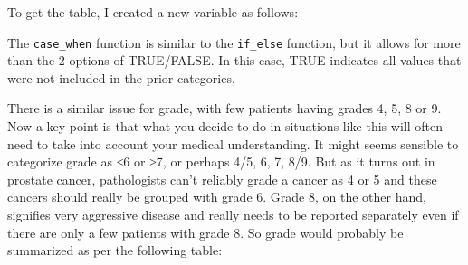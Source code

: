 \documentclass[]{book}
\newenvironment{Shaded}{\begin{snugshade}}{\end{snugshade}}
\newcommand{\DataTypeTok}[1]{\textcolor[rgb]{0.13,0.29,0.53}{#1}}
\newcommand{\KeywordTok}[1]{\textcolor[rgb]{0.13,0.29,0.53}{\textbf{#1}}}
\newcommand{\NormalTok}[1]{#1}
\newcommand{\OperatorTok}[1]{\textcolor[rgb]{0.81,0.36,0.00}{\textbf{#1}}}
\newcommand{\OtherTok}[1]{\textcolor[rgb]{0.56,0.35,0.01}{#1}}
\newcommand{\StringTok}[1]{\textcolor[rgb]{0.31,0.60,0.02}{#1}}
\begin{document}
To get the table, I created a new variable as follows:

\begin{Shaded}
\end{Shaded}

The \texttt{case\_when} function is similar to the \texttt{if\_else}
function, but it allows for more than the 2 options of TRUE/FALSE. In
this case, TRUE indicates all values that were not included in the prior
categories.

There is a similar issue for grade, with few patients having grades 4,
5, 8 or 9. Now a key point is that what you decide to do in situations
like this will often need to take into account your medical
understanding. It might seems sensible to categorize grade as ≤6 or ≥7,
or perhaps 4/5, 6, 7, 8/9. But as it turns out in prostate cancer,
pathologists can't reliably grade a cancer as 4 or 5 and these cancers
should really be grouped with grade 6. Grade 8, on the other hand,
signifies very aggressive disease and really needs to be reported
separately even if there are only a few patients with grade 8. So grade
would probably be summarized as per the following table:
\end{document}
